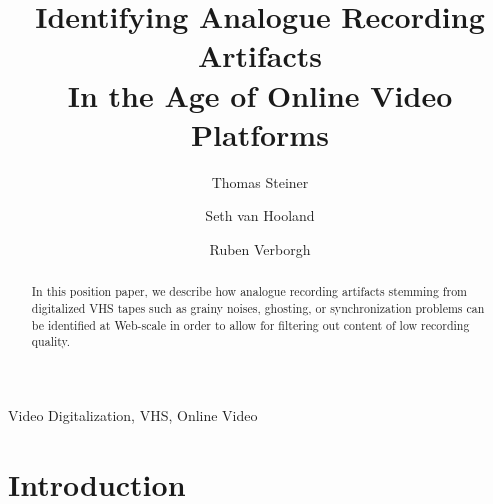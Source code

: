 \documentclass[runningheads,a4paper]{llncs}
\newcommand{\keywords}[1]{\par\addvspace\baselineskip
\noindent\keywordname\enspace\ignorespaces#1}
\begin{document}
\mainmatter

\title{Identifying Analogue Recording Artifacts\\
In the Age of Online Video Platforms}

\author{Thomas Steiner \and
        Seth van Hooland \and
        Ruben Verborgh}


\maketitle

\setcounter{footnote}{0}

\begin{abstract}
In this position paper, we describe how analogue recording artifacts
stemming from digitalized VHS tapes such as
grainy noises, ghosting, or synchronization problems
can be identified at Web-scale in order to
allow for filtering out content of low recording quality.
\end{abstract}

\keywords{Video Digitalization, VHS, Online Video}

\section{Introduction}
\end{document}

